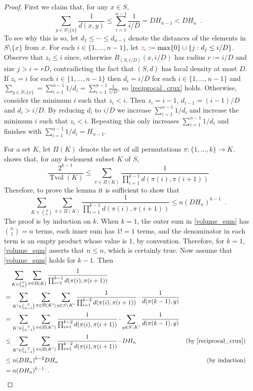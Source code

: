 \documentclass{patmorin}
\makeatletter
\def\mathcolor#1#{\@mathcolor{#1}}
\def\@mathcolor#1#2#3{%
  \protect\leavevmode
  \begingroup
    \color#1{#2}#3%
  \endgroup
}
\newcommand{\mathdefin}[1]{\mathcolor{brightmaroon}{#1}}
\DeclareMathOperator{\tvol}{Tvol}
\makeatother
\begin{document}
\begin{proof}
  First we claim that, for any $x\in S$,
  \begin{equation}
    \sum_{y\in S\setminus\{x\}} \frac{1}{d(x,y)} \le \sum_{i=1}^{n-1}\frac{1}{i/D} = DH_{n-1} < DH_n \enspace . \label{reciprocal_crux}
  \end{equation}
  To see why this is so, let $d_1\le\cdots\le d_{n-1}$ denote the distances of the elements in $S\setminus\{x\}$ from $x$.  For each $i\in\{1,\ldots,n-1\}$, let $\mathdefin{z_i}:=\max\{0\}\cup\{j: d_j \le i/D\}$. Observe that $z_i \le i$ since, otherwise $B_{(S,i/D)}(x,i/D)$ has radius $r:=i/D$ and size $j>i=rD$, contradicting the fact that $(S,d)$ has local density at most $D$.  If $z_i=i$ for each $i\in\{1,\ldots,n-1\}$ then $d_i=i/D$ for each $i\in\{1,\ldots,n-1\}$ and $\sum_{y\in S\setminus\{x\}}=\sum_{i=1}^{n-1}1/d_i=\sum_{i=1}^{n-1}\frac{1}{i/D}$, so \eqref{reciprocal_crux} holds.  Otherwise, consider the minimum $i$ such that $z_i < i$.  Then $z_i=i-1$, $d_{i-1}=(i-1)/D$ and $d_i > i/D$. By reducing $d_i$ to $i/D$ we increase $\sum_{i=1}^{n-1} 1/d_i$ and increase the minimum $i$ such that $z_i < i$.  Repeating this only increases $\sum_{i=1}^{n-1} 1/d_i$ and finishes with $\sum_{i=1}^{n-1} 1/d_i= H_{n-1}$.

  For a set $K$, let $\Pi(K)$ denote the set of all permutations $\pi:\{1,\ldots,k\}\to K$.
  \citet[Lemma~17]{feige:approximating} shows that, for any $k$-element subset $K$ of $S$,
  \[
    \frac{2^{k-1}}{\tvol(K)} \le \sum_{\pi\in\Pi(K)}\frac{1}{\prod_{i=1}^{k-1}d(\pi(i),\pi(i+1))}
  \]
  Therefore, to prove the lemma it is sufficient to show that
  \begin{equation}
    \sum_{K\in\binom{S}{k}}\sum_{\pi\in\Pi(K)}\frac{1}{\prod_{i=1}^{k-1}d(\pi(i),\pi(i+1))} \le n(DH_n)^{k-1} \enspace .
    \label{volume_sum}
  \end{equation}
  The proof is by induction on $k$.  When $k=1$, the outer sum in \cref{volume_sum} has $\binom{n}{1}=n$ terms, each inner sum has $1!=1$ terms, and the denominator in each term is an empty product whose value is $1$, by convention.  Therefore, for $k=1$, \cref{volume_sum} asserts that $n \le n$, which is certainly true.  Now assume that \cref{volume_sum} holds for $k-1$.  Then
  \begin{align*}
    & \quad \sum_{K\in\binom{S}{k}}\sum_{\pi\in\Pi(K)}\frac{1}{\prod_{i=1}^{k-1}d(\pi(i),\pi(i+1))} \\
    & = \sum_{K'\in\binom{S}{k-1}}\sum_{\pi\in\Pi(K')}\sum_{y\in S\setminus K'}\frac{1}{\prod_{i=1}^{k-2}d(\pi(i),\pi(i+1))}\cdot\frac{1}{d(\pi(k-1),y)} \\
    & = \sum_{K'\in\binom{S}{k-1}}\sum_{\pi\in\Pi(K')}\frac{1}{\prod_{i=1}^{k-2}d(\pi(i),\pi(i+1))}\cdot\sum_{y\in S\setminus K'}\frac{1}{d(\pi(k-1),y)} \\
    & \le \sum_{K'\in\binom{S}{k-1}}\sum_{\pi\in\Pi(K')}\frac{1}{\prod_{i=1}^{k-2}d(\pi(i),\pi(i+1))}\cdot DH_n & \text{(by \cref{reciprocal_crux})}\\
    & \le n(DH_n)^{k-2}DH_n & \text{(by induction)}\\
    & = n(DH_n)^{k-1} \enspace . & & \qedhere
  \end{align*}
\end{proof}
\end{document}
